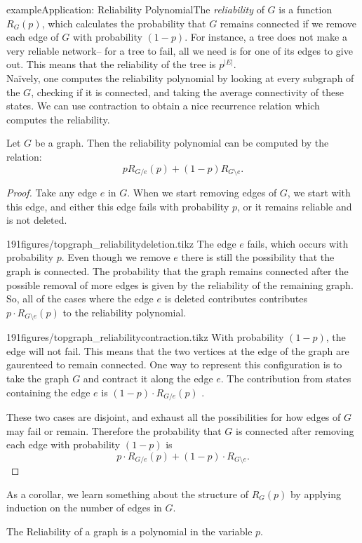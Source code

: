 \begin{framedpage}{example}{Application: Reliability Polynomial}{The \emph{reliability} of $G$ is a function $R_G(p)$, which calculates the probability that $G$ remains connected if we remove each edge of $G$ with probability $(1-p)$.}%
%
\label{sec:topgraph:reliability}%
 For instance, a tree does not make a very reliable network-- for a tree to fail, all we need is for one of its edges to give out. This means that the reliability of the tree is $p^{|E|}$.\\
Na\"ively, one computes the reliability polynomial by looking at every subgraph of the $G$, checking if it is connected, and taking the average connectivity of these states.
We can use contraction to obtain a nice recurrence relation which computes the reliability. 
\begin{prop}%
Let $G$ be a graph. Then the reliability polynomial can be computed by the relation:
 \[pR_{G/e}(p)+(1-p)R_{G\setminus e}.\] 
\end{prop}
\begin{proof}
 Take any edge $e$ in $G$. When we start removing edges of $G$, we start with this edge, and either this edge fails with probability $p$, or it remains reliable and is not deleted.
\begin{paragraphfigureenv}{191figures/topgraph_reliabilitydeletion.tikz}
  The edge $e$ fails, which occurs with probability $p$. Even though we remove $e$ there is still the possibility that the graph is connected. 
  The probability that the graph remains connected after the possible removal of more edges is given by the reliability of the remaining graph. So, all of the  cases where the edge $e$ is deleted contributes  contributes $p\cdot R_{G\setminus e}(p)$ to the reliability polynomial. 
\end{paragraphfigureenv}
  
\begin{paragraphfigureenv}{191figures/topgraph_reliabilitycontraction.tikz} With probability $(1-p)$, the edge will not fail. This means that the two vertices at the edge of the graph are gaurenteed to remain connected. One way to represent this configuration is to take the graph $G$ and contract it along the edge $e$.  The contribution from states containing the edge $e$ is $(1-p)\cdot R_{G/e}(p)$ .
\end{paragraphfigureenv}

These two cases are disjoint, and exhaust all the possibilities for how edges of $G$ may fail or remain. Therefore the probability that $G$ is connected after removing each edge with probability $(1-p)$ is 
\[p\cdot R_{G/e}(p)+(1-p)\cdot R_{G\setminus e}.\] 
\end{proof}

As a corollar, we learn something about the structure of $R_G(p)$ by applying induction on the number of edges in $G$. 
\begin{corollary}
The Reliability of a graph is a polynomial in the variable $p$. 
\end{corollary}
\end{framedpage}